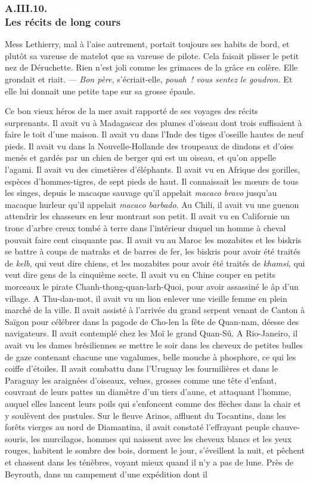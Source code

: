 \documentclass[french,twoside]{book} %
\begin{document}
 \subsubsection[{A.III.10. Les récits de long cours}]{A.III.10. \\
Les récits de long cours}
\noindent Mess Lethierry, mal à l’aise autrement, portait toujours ses habits de bord, et plutôt sa vareuse de matelot que sa vareuse de pilote. Cela faisait plisser le petit nez de Déruchette. Rien n’est joli comme les grimaces de la grâce en colère. Elle grondait et riait. — \emph{Bon père}, s’écriait-elle, \emph{pouah ! vous sentez le goudron.} Et elle lui donnait une petite tape sur sa grosse épaule.\par
Ce bon vieux héros de la mer avait rapporté de ses voyages des récits surprenants. Il avait vu à Madagascar des plumes d’oiseau dont trois suffisaient à faire le toit d’une maison. Il avait vu dans l’Inde des tiges d’oseille hautes de neuf pieds. Il avait vu dans la Nouvelle-Hollande des troupeaux de dindons et d’oies menés et gardés par un chien de berger qui est un oiseau, et qu’on appelle l’agami. Il avait vu des cimetières d’éléphants. Il avait vu en Afrique des gorilles, espèces d’hommes-tigres, de sept pieds de haut.  Il connaissait les mœurs de tous les singes, depuis le macaque sauvage qu’il appelait \emph{macaco bravo} jusqu’au macaque hurleur qu’il appelait \emph{macaco barbado}. Au Chili, il avait vu une guenon attendrir les chasseurs en leur montrant son petit. Il avait vu en Californie un tronc d’arbre creux tombé à terre dans l’intérieur duquel un homme à cheval pouvait faire cent cinquante pas. Il avait vu au Maroc les mozabites et les biskris se battre à coups de matraks et de barres de fer, les biskris pour avoir été traités de \emph{kelb,} qui veut dire chiens, et les mozabites pour avoir été traités de \emph{khamsi}, qui veut dire gens de la cinquième secte. Il avait vu en Chine couper en petits morceaux le pirate Chanh-thong-quan-larh-Quoi, pour avoir assassiné le âp d’un village. A Thu-dan-mot, il avait vu un lion enlever une vieille femme en plein marché de la ville. Il avait assisté à l’arrivée du grand serpent venant de Canton à Saïgon pour célébrer dans la pagode de Cho-len la fête de Quan-nam, déesse des navigateurs. Il avait contemplé chez les Moï le grand Quan-Sû. A Rio-Janeiro, il avait vu les dames brésiliennes se mettre le soir dans les cheveux de petites bulles de gaze contenant chacune une vagalumes, belle mouche à phosphore, ce qui les coiffe d’étoiles. Il avait combattu dans l’Uruguay les fourmilières et dans le Paraguay les araignées d’oiseaux, velues, grosses comme une tête d’enfant, couvrant de leurs pattes un diamètre d’un tiers d’aune, et attaquant l’homme, auquel elles lancent leurs poils qui s’enfoncent comme des flèches dans la chair et y soulèvent des pustules. Sur le fleuve Arinos,  affluent du Tocantins, dans les forêts vierges au nord de Diamantina, il avait constaté l’effrayant peuple chauve-souris, les murcilagos, hommes qui naissent avec les cheveux blancs et les yeux rouges, habitent le sombre des bois, dorment le jour, s’éveillent la nuit, et pêchent et chassent dans les ténèbres, voyant mieux quand il n’y a pas de lune. Près de Beyrouth, dans un campement d’une expédition dont il 
\end{document}
